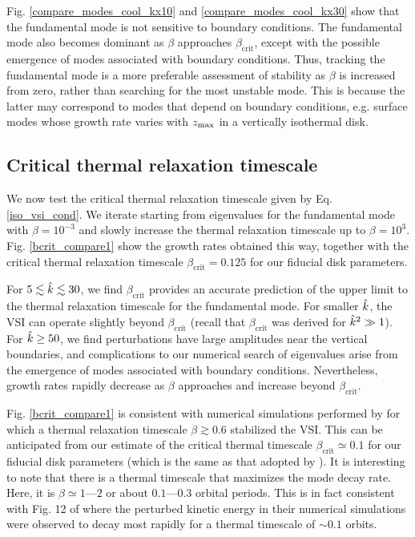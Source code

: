 Fig. \ref{compare_modes_cool_kx10} and \ref{compare_modes_cool_kx30} 
show that the fundamental mode is not sensitive to boundary
conditions. The fundamental mode also becomes dominant as $\beta$
approaches $\beta_\mathrm{crit}$, except with the possible emergence
of modes associated with boundary conditions. Thus, tracking the
fundamental mode is a more preferable assessment of stability as $\beta$
is increased from zero, rather than searching for the most unstable
mode. This is because the latter may correspond to modes that depend on boundary
conditions, e.g. surface modes whose growth rate varies with
$z_\mathrm{max}$ in a vertically isothermal disk. 



\subsection{Critical thermal relaxation
  timescale}\label{bcrit_num_test}
We now test the critical thermal relaxation timescale given by
Eq. \ref{iso_vsi_cond}. We iterate starting from eigenvalues for the fundamental
mode with $\beta=10^{-3}$ and slowly increase the thermal
relaxation timescale up to $\beta=10^3$. Fig. \ref{bcrit_compare1}
show the growth rates obtained this way, together with the critical  
thermal relaxation timescale $\beta_\mathrm{crit}=0.125$ for our
fiducial disk parameters.   

For $5\lesssim\hat{k}\lesssim30$, we find $\beta_\mathrm{crit}$ provides
an accurate prediction of the upper limit to the thermal relaxation 
timescale for the fundamental mode. For smaller $\hat{k}$, the VSI can
operate slightly beyond $\beta_\mathrm{crit}$ (recall that
$\beta_\mathrm{crit}$ was derived for $\hat{k}^2\gg 1$). For
$\hat{k}\geq 50$, we find perturbations have large amplitudes near the
vertical boundaries, and 
complications to our numerical search of
eigenvalues arise from the emergence of modes associated with boundary
conditions. %
Nevertheless, growth rates rapidly decrease as $\beta$
approaches and increase beyond $\beta_\mathrm{crit}$.  

Fig. \ref{bcrit_compare1} is consistent with numerical simulations
performed by \cite{nelson13} for which a thermal relaxation timescale
$\beta\gtrsim 0.6$ stabilized the VSI. This can be anticipated from our
estimate of the critical thermal timescale $\beta_\mathrm{crit}\simeq
0.1$ for our fiducial disk parameters (which is the same as that
adopted by \citeauthor{nelson13}). It is interesting to note that there is a
thermal timescale that maximizes the mode decay rate. Here,
it is $\beta\simeq1$---$2$ or 
about $0.1$---$0.3$ orbital periods. This is in fact consistent with 
Fig. 12 of \cite{nelson13} where the perturbed kinetic energy in their
numerical simulations were observed to decay most rapidly for a
thermal timescale of $\sim 0.1$ orbits.     

